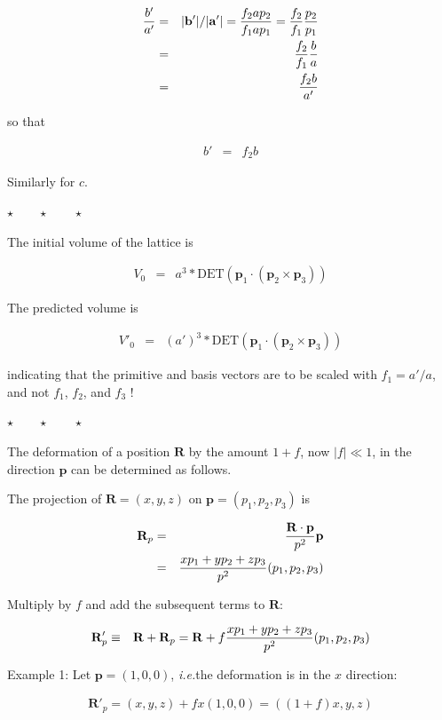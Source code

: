 \documentclass[a4paper,12pt,onecolumn]{article}
\makeatletter
\newcommand{\ie}{\emph{i.e.\@\xspace}}
\def\a{\mathbf{a}}
\def\b{\mathbf{b}}
\def\R{\mathbf{R}}
\def\p{\mathbf{p}}
\newcommand{\stars}{\begin{center} \vspace{0.5cm}$\star \qquad \star \qquad \star$\vspace{0.5cm}\end{center}}
\makeatother
\begin{document}
\begin{eqnarray}
{ b' \over a'} &=& |\b'| / |\a'| = {f_2 a p_2 \over f_1 a p_1} = {f_2 \over f_1} {p_2 \over p_1} \\
  &=& {f_2 \over f_1} {b \over a} \\
  &=& {f_2 b \over a'}
\end{eqnarray}

so that

\begin{eqnarray}
b' &=& f_2 b
\end{eqnarray}

Similarly for $c$.


\stars


The initial volume of the lattice is

\begin{eqnarray}
V_0 &=& a^3 * \mathrm{DET}(\p_1 \cdot (\p_2 \times \p_3))
\end{eqnarray}

The predicted volume is

\begin{eqnarray}
V'_0 &=& (a')^3 * \mathrm{DET}(\p_1 \cdot (\p_2 \times \p_3))
\end{eqnarray}

indicating that the primitive and basis vectors are to be scaled with
$f_1 = a' / a$, and not $f_1$, $f_2$, and $f_3$ !


\stars

The deformation of a position $\R$ by the amount $1+f$, now $|f| \ll 1$,
in the direction $\p$ can be determined as follows.

The projection of $\R = (x,y,z)$ on $\p=(p_1, p_2, p_3)$ is

\begin{eqnarray}
\R_p &=& {\R \cdot \p \over p^2} \p \\
  &=& {xp_1 + yp_2 + zp_3 \over p^2} (p_1, p_2, p_3)
\end{eqnarray}

Multiply by $f$ and add the subsequent terms to $\R$:

\begin{eqnarray}
\R'_p & \equiv & \R + \R_p = \R +  f {xp_1 + yp_2 + zp_3 \over p^2} (p_1, p_2, p_3)
\end{eqnarray}


Example 1: Let $\p = (1,0,0)$, \ie the deformation is in the $x$ direction:

\begin{eqnarray}
\R'_p =  (x,y,z) + f x  (1, 0, 0) = ((1+f)x, y, z)
\end{eqnarray}
\end{document}
